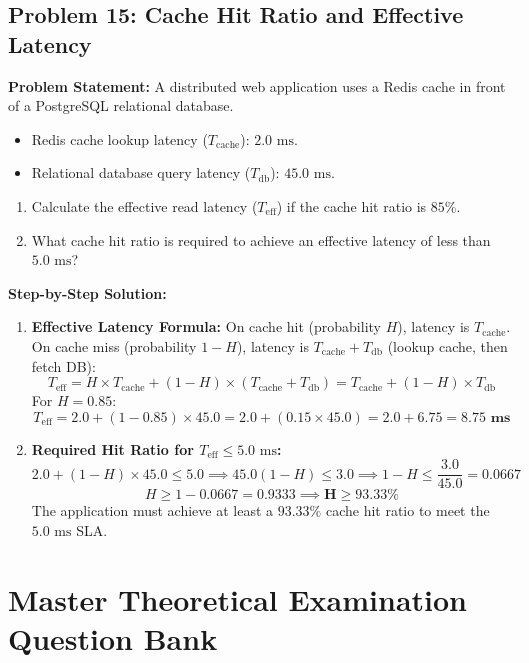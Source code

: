 \subsection*{Problem 15: Cache Hit Ratio and Effective Latency}
\textbf{Problem Statement:} A distributed web application uses a Redis cache in front of a PostgreSQL relational database.
\begin{itemize}
    \item Redis cache lookup latency ($T_{\text{cache}}$): $2.0\text{ ms}$.
    \item Relational database query latency ($T_{\text{db}}$): $45.0\text{ ms}$.
\end{itemize}
\begin{enumerate}[label=(\alph*)]
    \item Calculate the effective read latency ($T_{\text{eff}}$) if the cache hit ratio is $85\%$.
    \item What cache hit ratio is required to achieve an effective latency of less than $5.0\text{ ms}$?
\end{enumerate}

\textbf{Step-by-Step Solution:}
\begin{enumerate}[label=(\alph*)]
    \item \textbf{Effective Latency Formula:}
    On cache hit (probability $H$), latency is $T_{\text{cache}}$. On cache miss (probability $1 - H$), latency is $T_{\text{cache}} + T_{\text{db}}$ (lookup cache, then fetch DB):
    \[
    T_{\text{eff}} = H \times T_{\text{cache}} + (1 - H) \times (T_{\text{cache}} + T_{\text{db}}) = T_{\text{cache}} + (1 - H) \times T_{\text{db}}
    \]
    For $H = 0.85$:
    \[
    T_{\text{eff}} = 2.0 + (1 - 0.85) \times 45.0 = 2.0 + (0.15 \times 45.0) = 2.0 + 6.75 = \mathbf{8.75\text{ ms}}
    \]
    \item \textbf{Required Hit Ratio for $T_{\text{eff}} \le 5.0\text{ ms}$:}
    \[
    2.0 + (1 - H) \times 45.0 \le 5.0 \implies 45.0(1 - H) \le 3.0 \implies 1 - H \le \frac{3.0}{45.0} = 0.0667
    \]
    \[
    H \ge 1 - 0.0667 = 0.9333 \implies \mathbf{H \ge 93.33\%}
    \]
    The application must achieve at least a $93.33\%$ cache hit ratio to meet the $5.0\text{ ms}$ SLA.
\end{enumerate}


\section{Master Theoretical Examination Question Bank}
\label{sec:se_theoretical_bank}

